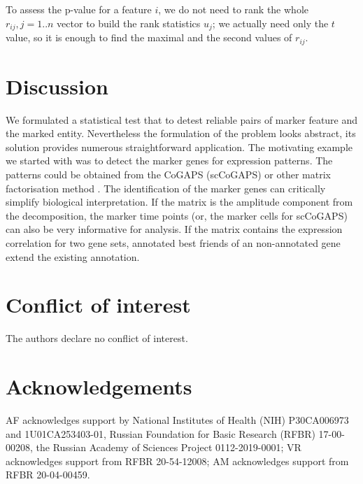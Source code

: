 \documentclass{llncs}
\begin{document}
To assess the p-value for a feature $i$, we do not need to rank the whole $r_{ij}, j=1..n$ vector to build the rank statistics $u_j$; we actually need only the $t$ value, so it is enough to find the maximal and the second values of $r_{ij}$.

\section{Discussion}

We formulated a statistical test that to detest reliable pairs of marker feature and the marked entity. Nevertheless the formulation of the problem looks abstract, its solution provides numerous straightforward application. The motivating example we started with was to detect the marker genes for expression patterns. The patterns could be obtained from the CoGAPS (scCoGAPS) \cite{Fertig_2016} or other matrix factorisation method \cite{Stein_2018}. The identification of the marker genes can critically simplify biological interpretation. If the matrix is the amplitude component from  the decomposition, the marker time points (or, the marker cells for scCoGAPS) can also be very informative for analysis. If the matrix contains the expression correlation for two gene sets, annotated best friends of an non-annotated gene extend the existing annotation.

\section{Conflict of interest}
The authors declare no conflict of interest.

\section{Acknowledgements}
AF acknowledges support by National Institutes of Health (NIH) P30CA006973 and 1U01CA253403-01, Russian Foundation for Basic Research (RFBR) 17-00-00208, the Russian Academy of Sciences Project 0112-2019-0001; VR acknowledges support from RFBR 20-54-12008; AM acknowledges support from RFBR 20-04-00459.





\newcommand{\beginsupplement}{%
        \setcounter{table}{0}
        \renewcommand{\thetable}{S\arabic{table}}%
        \setcounter{figure}{0}
        \renewcommand{\thefigure}{S\arabic{figure}}
        \setcounter{equation}{0}
        \renewcommand{\theequation}{S\arabic{equation}}%
     }
\end{document}

